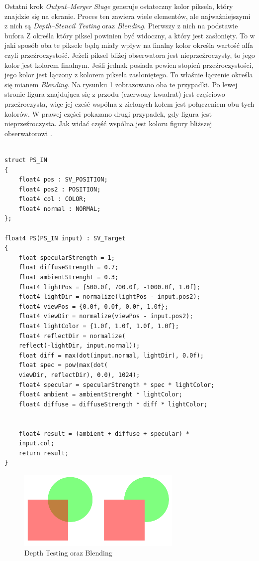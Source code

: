 \documentclass[archive]{mgr}
\begin{document}
Ostatni krok \emph{Output–Merger Stage} generuje ostateczny kolor piksela, który znajdzie się na ekranie. Proces ten zawiera wiele elementów, ale najważniejszymi z nich są \emph{Depth–Stencil Testing} oraz \emph{Blending}. Pierwszy z nich na podstawie bufora Z określa który piksel powinien być widoczny, a który jest zasłonięty. To w jaki sposób oba te piksele będą miały wpływ na finalny kolor określa wartość alfa czyli przeźroczystość. Jeżeli piksel bliżej obserwatora jest nieprzeźroczysty, to jego kolor jest kolorem finalnym. Jeśli jednak posiada pewien stopień przeźroczystości, jego kolor jest łączony z kolorem piksela zasłoniętego. To właśnie łączenie określa się mianem \emph{Blending}. Na rysunku \ref{lab:directxdepth} zobrazowano oba te przypadki. Po lewej stronie figura znajdująca się z przodu (czerwony kwadrat) jest częściowo przeźroczysta, więc jej cześć wspólna z zielonych kołem jest połączeniem obu tych kolorów. W prawej części pokazano drugi przypadek, gdy figura jest nieprzeźroczysta. Jak widać część wspólna jest koloru figury bliższej obserwatorowi \cite{DirectXdepth}.

\newpage
\begin{lstlisting}[caption={Pixel Shader, oświetlenie Phonga},captionpos=b,label={lab:directxpixelshader}]

struct PS_IN
{
	float4 pos : SV_POSITION;
	float4 pos2 : POSITION;
	float4 col : COLOR;
	float4 normal : NORMAL;
};

float4 PS(PS_IN input) : SV_Target
{
	float specularStrength = 1;
	float diffuseStrength = 0.7;
	float ambientStrenght = 0.3;
	float4 lightPos = {500.0f, 700.0f, -1000.0f, 1.0f};
	float4 lightDir = normalize(lightPos - input.pos2);
	float4 viewPos = {0.0f, 0.0f, 0.0f, 1.0f};
	float4 viewDir = normalize(viewPos - input.pos2);
	float4 lightColor = {1.0f, 1.0f, 1.0f, 1.0f};
	float4 reflectDir = normalize(
	reflect(-lightDir, input.normal));
	float diff = max(dot(input.normal, lightDir), 0.0f);
	float spec = pow(max(dot(
	viewDir, reflectDir), 0.0), 1024);
	float4 specular = specularStrength * spec * lightColor;
	float4 ambient = ambientStrenght * lightColor;
	float4 diffuse = diffuseStrength * diff * lightColor;


	float4 result = (ambient + diffuse + specular) *
	input.col;
	return result;
}
\end{lstlisting}

\begin{figure}[h!]
  \centering
    \includegraphics[width=0.70\textwidth]{images/depth.png}
   \caption{Depth Testing oraz Blending}
   \label{lab:directxdepth}
\end{figure}
\newpage
\end{document}
